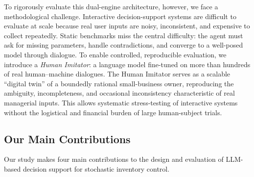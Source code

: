 \documentclass[mnsc,nonblindrev]{informs3_hide}
\begin{document}
To rigorously evaluate this dual-engine architecture, however, we face a methodological challenge.
Interactive decision-support systems are difficult to evaluate at scale because real user inputs are noisy, inconsistent, and expensive to collect repeatedly. Static benchmarks miss the central difficulty: the agent must ask for missing parameters, handle contradictions, and converge to a well-posed model through dialogue. To enable controlled, reproducible evaluation, we introduce a \emph{Human Imitator}: a language model fine-tuned on more than hundreds of real human--machine dialogues. The Human Imitator serves as a scalable “digital twin” of a boundedly rational small-business owner, reproducing the ambiguity, incompleteness, and occasional inconsistency characteristic of real managerial inputs. This allows systematic stress-testing of interactive systems without the logistical and financial burden of large human-subject trials.



\subsection{Our Main Contributions}


Our study makes four main contributions to the design and evaluation of LLM-based decision support for stochastic inventory control.
\end{document}
